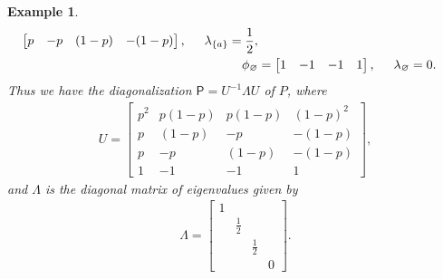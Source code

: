 \documentclass[11pt,a4paper]{article}
\newtheorem{example}[theorem]{Example}
\begin{document}
\begin{example}
\begin{align*}
\begin{bmatrix}
                p & -p & (1-p) & -(1-p)
            \end{bmatrix},\hspace{.5cm}\lambda_{\{a\}} = \frac{1}{2},\\
            \phi_{\varnothing} &= \begin{bmatrix}
                1 & -1 & -1 & 1
            \end{bmatrix},\hspace{.5cm}\lambda_{\varnothing} = 0.\\
        \end{align*}
    Thus we have the diagonalization $\mathsf{P} = U^{-1} \Lambda U$ of $P$, where
        \begin{align}\label{eq:u}
            U = \begin{bmatrix}
                p^2 & p(1-p) & p(1-p) & (1-p)^2 \\
                p & (1-p) & -p & -(1-p) \\ 
                p & -p & (1-p) & -(1-p) \\ 
                1 & -1 & -1 & 1
            \end{bmatrix},
        \end{align}
    and $\Lambda$ is the diagonal matrix of eigenvalues given by
        \begin{align}\label{eq:lambda}
            \Lambda = \begin{bmatrix}
                1 & & & \\
                & \frac{1}{2} & &\\
                & & \frac{1}{2} & \\
                & & & 0
            \end{bmatrix}.
        \end{align}

\end{example}
\end{document}
